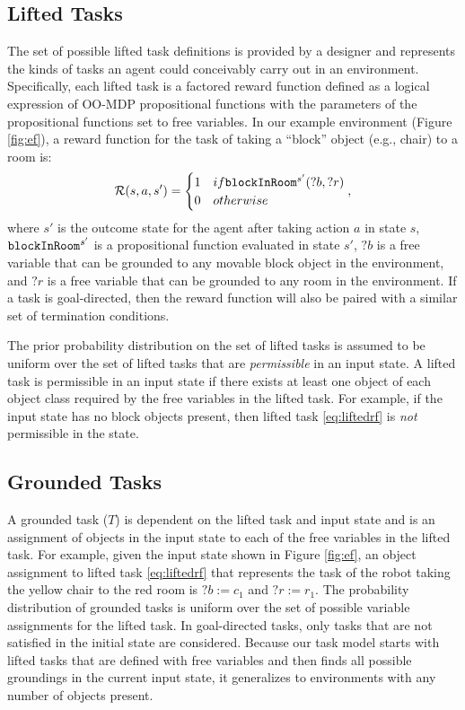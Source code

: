 \documentclass[conference]{IEEEtran}
\begin{document}
\subsection{Lifted Tasks}
The set of possible lifted task definitions is provided by a designer and represents the kinds of tasks an agent could conceivably carry out in an environment. Specifically, each lifted task is a factored reward function defined as a logical expression of OO-MDP propositional functions with the parameters of the propositional functions set to free variables. In our example environment (Figure \ref{fig:ef}), a reward function for the task of taking a ``block'' object (e.g., chair) to a room is:
\begin{equation}
\label{eq:liftedrf}
{\cal R}(s, a, s') = \begin{cases}
1 & \mbox{if } {\tt blockInRoom}^{s'}(?b, ?r) \\
0 & \mbox{otherwise}
\end{cases},
\end{equation}
where $s'$ is the outcome state for the agent after taking action $a$ in state $s$, ${\tt blockInRoom}^{s'}$ is a propositional function evaluated in state $s'$, $?b$ is a free variable that can be grounded to any movable block object in the environment, and $?r$ is a free variable that can be grounded to any room in the environment. 
If a task is goal-directed, then the reward function will also be paired with a similar set of termination conditions.

The prior probability distribution on the set of lifted tasks is assumed to be uniform over the set of lifted tasks that are {\em permissible} in an input state. A lifted task is permissible in an input state if there exists at least one object of each object class required by the free variables in the lifted task. For example, if the input state has no block objects present, then lifted task \ref{eq:liftedrf} is {\em not} permissible in the state. 

\subsection{Grounded Tasks}
A grounded task ($T$) is dependent on the lifted task and input state and is an assignment of objects in the input state to each of the free variables in the lifted task. For example, given the input state shown in Figure \ref{fig:ef}, an object assignment to lifted task \ref{eq:liftedrf} that represents the task of the robot taking the yellow chair to the red room is $?b:=c_1$ and $?r:=r_1$. The probability distribution of grounded tasks is uniform over the set of possible variable assignments for the lifted task. In goal-directed tasks, only tasks that are not satisfied in the initial state are considered.
Because our task model starts with lifted tasks that are defined with free variables and then finds all possible groundings in the current input state, it generalizes to environments with any number of objects present.
\end{document}
